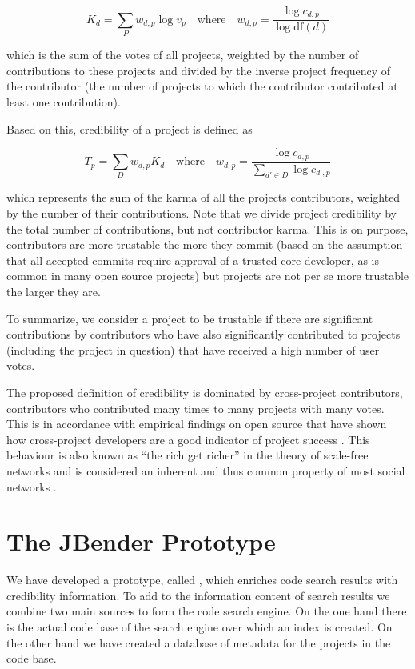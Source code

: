     $$K_{d} = \sum_{P} w_{d,p} \log v_p
    \quad \mathrm{where} \quad 
    w_{d,p} = \frac{\log c_{d,p}}{\log \mathrm{df}(d)}$$

\noindent
which is the sum of the votes of all projects, weighted by the number of contributions to these projects and divided by the inverse project frequency of the contributor (\ie the number of projects to which the contributor contributed at least one contribution).


Based on this, credibility of a project is defined as 

	$$T_{p} = \sum_{D} w_{d,p} K_d
	\quad \mathrm{where} \quad 
	w_{d,p} = \frac{\log c_{d,p}}{\sum_{d' \in D} \log c_{d',p}}$$

\noindent
which represents the sum of the karma of all the projects contributors, weighted by the number of their contributions.
Note that we divide project credibility by the total number of contributions, but not contributor karma. This is on purpose, contributors are more trustable the more they commit (based on the assumption that all accepted commits require approval of a trusted core developer, as is common in many open source projects) but projects are not per se more trustable the larger they are.

To summarize, we consider a project to be trustable if there are significant contributions by contributors who have also significantly contributed to projects (including the project in question) that have received a high number of user votes.

The proposed definition of credibility is dominated by cross-project contributors, \ie contributors who contributed many times to many projects with many votes. This is in accordance with empirical findings on open source that have shown how cross-project developers are a good indicator of project success \cite{Kats07a}. This behaviour is also known as ``the rich get richer'' in the theory of scale-free networks and is considered an inherent and thus common property of most social networks \cite{Bara03a}.

\section{The JBender Prototype}
\label{sec:approach}

We have developed a prototype, called \Jbd, which enriches code search results with credibility information. To add to the information content of search results we combine two main sources to form the \Jbd code search engine. On the one hand there is the actual code base of the search engine over which an index is created. On the other hand we have created a database of metadata for the projects in the code base. 

